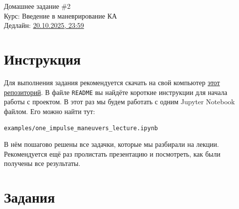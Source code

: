 \documentclass[12pt]{article}
\begin{document}
\begin{center}
  {\LARGE Домашнее задание \#2}\\[4pt]
  {\large Курс: Введение в маневрирование КА}\\[2pt]
  {\small Дедлайн: \underline{20.10.2025, 23:59} }
\end{center}

\bigskip

\section*{Инструкция}
Для выполнения задания рекомендуется скачать на свой компьютер \href{https://github.com/Chelovechek-move/maneuvering}{этот репозиторий}. В файле \texttt{README} вы найдёте короткие инструкции для начала работы с проектом. В этот раз мы будем работать с одним Jupyter Notebook файлом. Его можно найти тут:
\begin{center}
    \texttt{examples/one\_impulse\_maneuvers\_lecture.ipynb}    
\end{center}
В нём пошагово решены все задачки, которые мы разбирали на лекции. Рекомендуется ещё раз пролистать презентацию и посмотреть, как были получены все результаты.

\section*{Задания}
\end{document}
